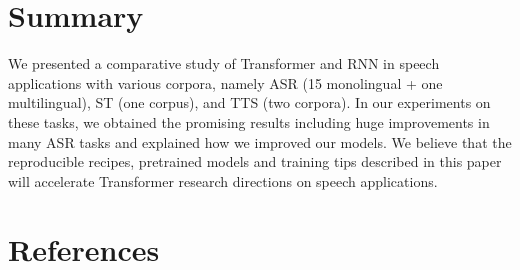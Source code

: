 \section{Summary}

We presented a comparative study of Transformer and RNN in speech applications with various corpora, namely ASR (15 monolingual + one multilingual), ST (one corpus), and TTS (two corpora).
In our experiments on these tasks, we obtained the promising results including huge improvements in many ASR tasks and explained how we improved our models.
We believe that the reproducible recipes, pretrained models and training tips described in this paper will accelerate Transformer research directions on speech applications.




\section{References}
\printbibliography







